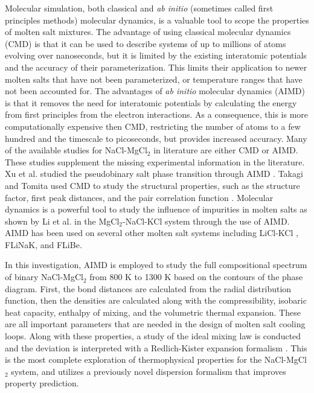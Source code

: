 \documentclass[review]{elsarticle}
\begin{document}
Molecular simulation, both classical and \textit{ab initio} (sometimes called first principles methods) molecular dynamics, is a valuable tool to scope the properties of molten salt mixtures. The advantage of using classical molecular dynamics (CMD) is that it can be used to describe systems of up to millions of atoms evolving over nanoseconds, but it is limited by the existing interatomic potentials and the accuracy of their parameterization. This limits their application to newer molten salts that have not been parameterized, or temperature ranges that have not been accounted for. The advantages of \textit{ab initio} molecular dynamics (AIMD) is that it removes the need for interatomic potentials by calculating the energy from first principles from the electron interactions. As a consequence, this is more computationally expensive then CMD, restricting the number of atoms to a few hundred and the timescale to picoseconds, but provides increased accuracy. Many of the available studies for NaCl-MgCl$_{2}$ in literature are either CMD or AIMD. These studies supplement the missing experimental information in the literature. Xu et al. studied the pseudobinary salt phase transition through AIMD \cite{XU2020568}. Takagi and Tomita used CMD to study the structural properties, such as the structure factor, first peak distances, and the pair correlation function \cite{takagi1993structure}. Molecular dynamics is a powerful tool to study the influence of impurities in molten salts as shown by Li et al. \cite{li2020insight} in the MgCl$_{2}$-NaCl-KCl system through the use of AIMD. AIMD has been used on several other molten salt systems including LiCl-KCl \cite{Duemmler2021,Bengston2014,Song2017}, FLiNaK\cite{NAM2014148}, and FLiBe\cite{NAM2014148}. 

In this investigation, AIMD is employed to study the full compositional spectrum of binary NaCl-MgCl$_{2}$ from 800 K to 1300 K based on the contours of the phase diagram. First, the bond distances are calculated from the radial distribution function, then the densities are calculated along with the compressibility, isobaric heat capacity, enthalpy of mixing, and the volumetric thermal expansion. These are all important parameters that are needed in the design of molten salt cooling loops. Along with these properties, a study of the ideal mixing law is conducted and the deviation is interpreted with a Redlich-Kister expansion formalism \cite{redlich1948}. This is the most complete exploration of thermophysical properties for the NaCl-MgCl$_2$ system, and utilizes a previously novel dispersion formalism that improves property prediction. 
\end{document}
